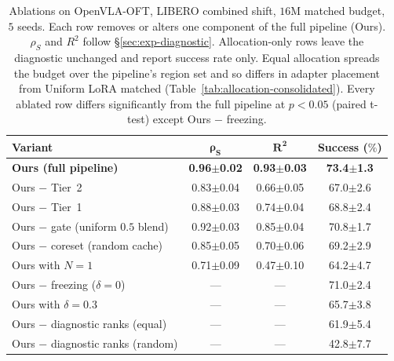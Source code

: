\begin{table}[tbp]
    \centering
    \setlength{\abovecaptionskip}{0pt}
    \setlength{\belowcaptionskip}{-5pt}
    \caption{Ablations on OpenVLA-OFT, LIBERO combined shift, $16$M matched budget, $5$ seeds. Each row removes or alters one component of the full pipeline (Ours). $\rho_S$ and $R^2$ follow \S\ref{sec:exp-diagnostic}. Allocation-only rows leave the diagnostic unchanged and report success rate only. Equal allocation spreads the budget over the pipeline's region set and so differs in adapter placement from Uniform LoRA matched (Table~\ref{tab:allocation-consolidated}). Every ablated row differs significantly from the full pipeline at $p<0.05$ (paired t-test) except Ours $-$ freezing.}
    \label{tab:ablations-compact}
    \scriptsize
    \renewcommand{\arraystretch}{0.92}
    \setlength{\tabcolsep}{3.5pt}
    \begin{tabular}{@{}lccc@{}}
        \toprule
        \textbf{Variant} & $\boldsymbol{\rho_S}$ & $\boldsymbol{R^2}$ & \textbf{Success ($\%$)} \\
        \midrule
        \textbf{Ours (full pipeline)}             & \textbf{0.96$\pm$0.02} & \textbf{0.93$\pm$0.03} & \textbf{73.4$\pm$1.3} \\
        \midrule
        Ours $-$ Tier~2                           & 0.83$\pm$0.04 & 0.66$\pm$0.05 & 67.0$\pm$2.6 \\
        Ours $-$ Tier~1                           & 0.88$\pm$0.03 & 0.74$\pm$0.04 & 68.8$\pm$2.4 \\
        Ours $-$ gate (uniform $0.5$ blend)       & 0.92$\pm$0.03 & 0.85$\pm$0.04 & 70.8$\pm$1.7 \\
        Ours $-$ coreset (random cache)           & 0.85$\pm$0.05 & 0.70$\pm$0.06 & 69.2$\pm$2.9 \\
        Ours with $N = 1$                         & 0.71$\pm$0.09 & 0.47$\pm$0.10 & 64.2$\pm$4.7 \\
        \midrule
        Ours $-$ freezing ($\delta = 0$)          & --- & --- & 71.0$\pm$2.4 \\
        Ours with $\delta = 0.3$                  & --- & --- & 65.7$\pm$3.8 \\
        Ours $-$ diagnostic ranks (equal)         & --- & --- & 61.9$\pm$5.4 \\
        Ours $-$ diagnostic ranks (random)        & --- & --- & 42.8$\pm$7.7 \\
        \bottomrule
    \end{tabular}
\end{table}
